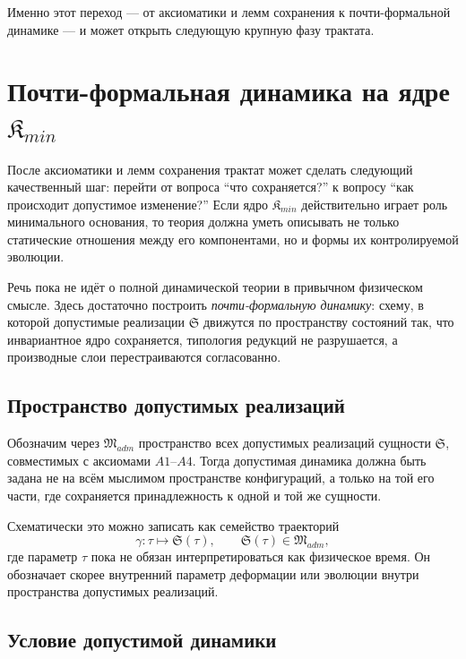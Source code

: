 \documentclass[12pt,a4paper]{article}
\begin{document}
Именно этот переход --- от аксиоматики и лемм сохранения к почти-формальной динамике --- и может открыть следующую крупную фазу трактата.

\section{Почти-формальная динамика на ядре \texorpdfstring{$\mathfrak{K}_{min}$}{Kmin}}

После аксиоматики и лемм сохранения трактат может сделать следующий качественный шаг: перейти от вопроса ``что сохраняется?'' к вопросу ``как происходит допустимое изменение?'' Если ядро \(\mathfrak{K}_{min}\) действительно играет роль минимального основания, то теория должна уметь описывать не только статические отношения между его компонентами, но и формы их контролируемой эволюции.

Речь пока не идёт о полной динамической теории в привычном физическом смысле. Здесь достаточно построить \textit{почти-формальную динамику}: схему, в которой допустимые реализации \(\mathfrak{S}\) движутся по пространству состояний так, что инвариантное ядро сохраняется, типология редукций не разрушается, а производные слои перестраиваются согласованно.

\subsection{Пространство допустимых реализаций}

Обозначим через \(\mathfrak{M}_{adm}\) пространство всех допустимых реализаций сущности \(\mathfrak{S}\), совместимых с аксиомами \(A1\)--\(A4\). Тогда допустимая динамика должна быть задана не на всём мыслимом пространстве конфигураций, а только на той его части, где сохраняется принадлежность к одной и той же сущности.

Схематически это можно записать как семейство траекторий
\begin{equation}
\gamma: \tau \longmapsto \mathfrak{S}(\tau),
\qquad
\mathfrak{S}(\tau)\in \mathfrak{M}_{adm},
\end{equation}
где параметр \(\tau\) пока не обязан интерпретироваться как физическое время. Он обозначает скорее внутренний параметр деформации или эволюции внутри пространства допустимых реализаций.

\subsection{Условие допустимой динамики}
\end{document}
